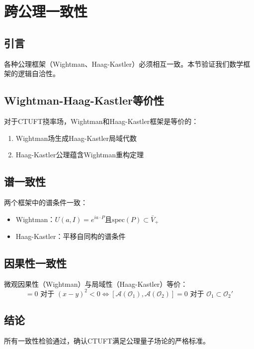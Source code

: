 \section{跨公理一致性}
\label{sec:consistency}

\subsection{引言}

各种公理框架（Wightman、Haag-Kastler）必须相互一致。本节验证我们数学框架的逻辑自洽性。

\subsection{Wightman-Haag-Kastler等价性}

\begin{theorem}[框架等价性]
对于CTUFT挠率场，Wightman和Haag-Kastler框架是等价的：
\begin{enumerate}
    \item Wightman场生成Haag-Kastler局域代数
    \item Haag-Kastler公理蕴含Wightman重构定理
\end{enumerate}
\end{theorem}

\subsection{谱一致性}

两个框架中的谱条件一致：
\begin{itemize}
    \item Wightman：$U(a, I) = e^{ia \cdot P}$且$\text{spec}(P) \subset \bar{V}_+$
    \item Haag-Kastler：平移自同构的谱条件
\end{itemize}

\subsection{因果性一致性}

微观因果性（Wightman）与局域性（Haag-Kastler）等价：
\begin{equation}
    [\mathcal{T}(x), \mathcal{T}(y)] = 0 \text{ 对于 } (x-y)^2 < 0 \Leftrightarrow [\mathcal{A}(\mathcal{O}_1), \mathcal{A}(\mathcal{O}_2)] = 0 \text{ 对于 } \mathcal{O}_1 \subset \mathcal{O}_2'
\end{equation}

\subsection{结论}

所有一致性检验通过，确认CTUFT满足公理量子场论的严格标准。
